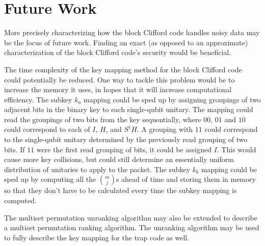 \section{Future Work}
More precisely characterizing how the block Clifford code handles noisy data may be the focus of future work. Finding an exact (as opposed to an approximate) characterization of the block Clifford code's security would be beneficial. 

The time complexity of the key mapping method for the block Clifford code could potentially be reduced. One way to tackle this problem would be to increase the memory it uses, in hopes that it will increase computational efficiency. The subkey $k_a$ mapping could be sped up by assigning groupings of two adjacent bits in the binary key to each single-qubit unitary. The mapping could read the groupings of two bits from the key sequentially, where $00$, $01$ and $10$ could correspond to each of $I$, $H$, and $S^{\dagger}H$. A grouping with $11$ could correspond to the single-qubit unitary determined by the previously read grouping of two bits. If $11$ were the first read grouping of bits, it could be assigned $I$. This would cause more key collisions, but could still determine an essentially uniform distribution of unitaries to apply to the packet. The subkey $k_b$ mapping could be sped up by computing all the ${m \choose j}$s ahead of time and storing them in memory so that they don't have to be calculated every time the subkey mapping is computed. 

The multiset permutation unranking algorithm may also be extended to describe a multiset permutation ranking algorithm. The unranking algorithm may be used to fully describe the key mapping for the trap code as well.





%




